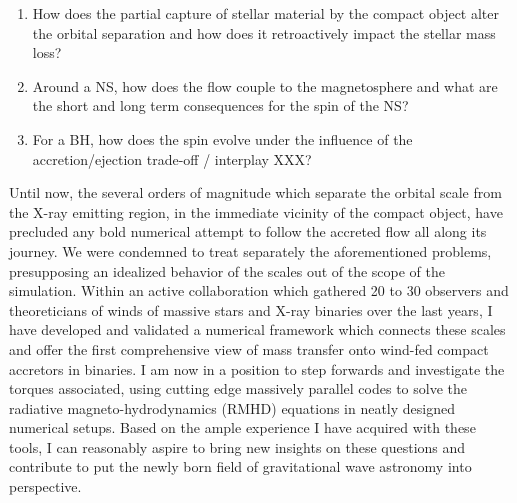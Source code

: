 \documentclass[letterpaper,12pt,onecolumn]{article}
\makeatletter
\newcommand*{\hmxb}{HMXB\@\xspace}
\newcommand*{\ns}{NS\@\xspace}
\newcommand*{\bh}{BH\@\xspace}
\makeatother
\begin{document}

%

\begin{enumerate}
\item How does the partial capture of stellar material by the compact object alter the orbital separation and how does it retroactively impact the stellar mass loss?
\item Around a \ns, how does the flow couple to the magnetosphere and what are the short and long term consequences for the spin of the \ns? 
\item For a \bh, how does the spin evolve under the influence of the accretion/ejection trade-off / interplay XXX?
\end{enumerate}

Until now, the several orders of magnitude which separate the orbital scale from the X-ray emitting region, in the immediate vicinity of the compact object, have precluded any bold numerical attempt to follow the accreted flow all along its journey. We were condemned to treat separately the aforementioned problems, presupposing an idealized behavior of the scales out of the scope of the simulation. Within an active collaboration which gathered 20 to 30 observers and theoreticians of winds of massive stars and X-ray binaries over the last years, I have developed and validated a numerical framework which connects these scales and offer the first comprehensive view of mass transfer onto wind-fed compact accretors in binaries. I am now in a position to step forwards and investigate the torques associated, using cutting edge massively parallel codes to solve the radiative magneto-hydrodynamics (RMHD) equations in neatly designed numerical setups. Based on the ample experience I have acquired with these tools, I can reasonably aspire to bring new insights on these questions and contribute to put the newly born field of gravitational wave astronomy into perspective.
\end{document}
